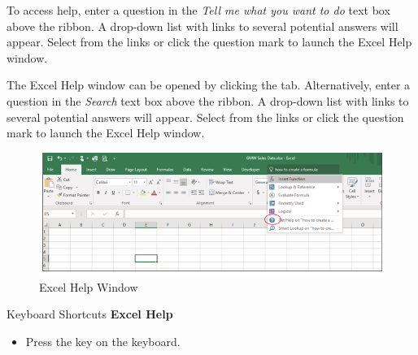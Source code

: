  To access help, enter a question in the \textit{Tell me what you want to do} text box above the ribbon. A drop-down list with links to several potential answers will appear. Select from the links or click the question mark to launch the Excel Help window.

 The Excel Help window can be opened by clicking the  tab. Alternatively, enter a question in the \textit{Search} text box above the ribbon. A drop-down list with links to several potential answers will appear. Select from the links or click the question mark to launch the Excel Help window.

\begin{figure}[H]
	\centering
	\includegraphics[width=\maxwidth{.95\linewidth}]{gfx/ch01_fig14}
	\caption{Excel Help Window}
	\label{01:fig14}
\end{figure}

\begin{center}
	\begin{shtcutbox}{Keyboard Shortcuts}
		\textbf{Excel Help}
		\\
		\begin{itemize}
			\setlength{\itemsep}{0pt}
			\setlength{\parskip}{0pt}
			\setlength{\parsep}{0pt}
			
			\item Press the  key on the keyboard.
			
		\end{itemize}
	\end{shtcutbox}
\end{center}


